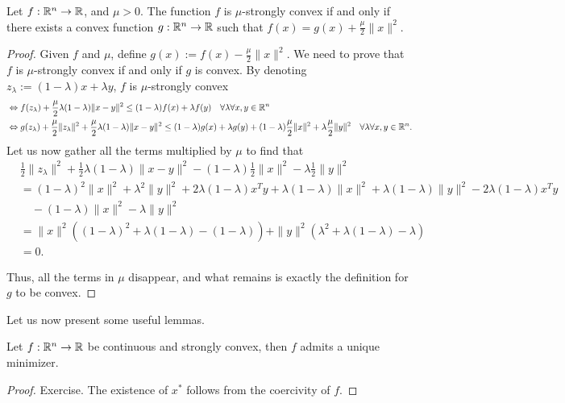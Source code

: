 \documentclass[10pt,a4paper]{article}
\begin{document}
\begin{lemma}
	Let $f : \mathbb{R}^n \to \mathbb{R}$, and $\mu > 0$. The function $f$ is $\mu$-strongly convex if and only if there exists a convex function $g : \mathbb{R}^n \to \mathbb{R}$ such that $f(x) = g(x) + \frac{\mu}{2}\|x\|^2$.
\end{lemma} 
\begin{proof}
	Given $f$ and $\mu$, define $g(x) := f(x) - \frac{\mu}{2}\|x\|^2$. We need to prove that $f$ is $\mu$-strongly convex if and only if $g$ is convex. By denoting $z_\lambda := (1-\lambda)x + \lambda y$,  $f$ is $\mu$-strongly convex
	\begin{align*}
		&\Leftrightarrow f(z_\lambda) + \frac{\mu}{2}\lambda(1-\lambda)\|x - y\|^2 \leq (1-\lambda)f(x) + \lambda f(y) \quad \forall \lambda \forall x, y\in \mathbb{R}^n \\
		&\Leftrightarrow g(z_\lambda) + \frac{\mu}{2}\|z_\lambda\|^2 + \frac{\mu}{2}\lambda(1-\lambda)\|x - y\|^2 \leq (1-\lambda)g(x) + \lambda g(y) + (1-\lambda)\frac{\mu}{2}\|x\|^2 + \lambda\frac{\mu}{2}\|y\|^2 \quad \forall \lambda \forall x, y\in \mathbb{R}^n.
	\end{align*}
	Let us now gather all the terms multiplied by $\mu$ to find that
	\begin{align*}
		&\frac{1}{2}\|z_\lambda\|^2 + \frac{1}{2}\lambda(1-\lambda)\|x - y\|^2 - (1-\lambda)\frac{1}{2}\|x\|^2 - \lambda\frac{1}{2}\|y\|^2 \\
		&= (1-\lambda)^2\|x\|^2 + \lambda^2\|y\|^2 + 2\lambda(1-\lambda) x^Ty + \lambda(1-\lambda)\|x\|^2 + \lambda(1-\lambda)\|y\|^2 - 2\lambda(1-\lambda) x^Ty\\
		&\quad - (1-\lambda)\|x\|^2 - \lambda\|y\|^2 \\
		&= \|x\|^2\left((1-\lambda)^2 + \lambda(1-\lambda) - (1-\lambda)\right) + \|y\|^2\left(\lambda^2 + \lambda(1-\lambda) - \lambda\right) \\
		&= 0.
	\end{align*}
	
	\noindent Thus, all the terms in $\mu$ disappear, and what remains is exactly the definition for $g$ to be convex.
\end{proof}

\noindent Let us now present some useful lemmas. 
\begin{lemma}
	Let $f : \mathbb{R}^n \to \mathbb{R}$ be continuous and strongly convex, then $f$ admits a unique minimizer.
\end{lemma}
\begin{proof}
	Exercise. The existence of $x^*$ follows from the coercivity of $f$.
\end{proof}
\end{document}

